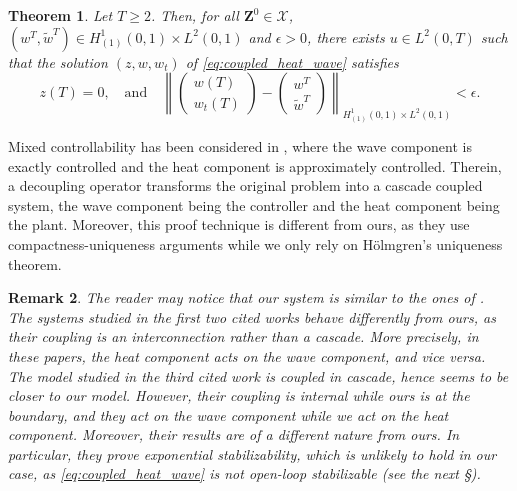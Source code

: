 \documentclass[10pt]{article}
\newtheorem{Theorem}{Theorem}[section]
\newtheorem{Remark}[Theorem]{Remark}
\begin{document}
\begin{Theorem}\label{theo:mixed_quakes}
Let $T \geq 2$. Then, for all $\mathbf{Z}^0 \in \mathcal{X}$, $(w^T,\tilde w^T) \in H^1_{(1)}(0,1) \times L^2(0,1)$ and $\epsilon > 0$, there exists $u \in L^2(0,T)$ such that the solution $(z,w,w_t)$ of \eqref{eq:coupled_heat_wave} satisfies
\begin{equation}\label{eq:contro_simul}
z(T) = 0,\quad \mathrm{and} \quad \left\| \left( \begin{array}{c}
    w(T)  \\
    w_t(T) 
\end{array}\right) - \left( \begin{array}{c}
    w^T  \\
    \tilde{w}^T
\end{array}\right) \right\|_{H^1_{(1)}(0,1) \times L^2(0,1)} < \epsilon.
\end{equation}
\end{Theorem}
Mixed controllability has been considered in \cite{zuazua_control_thermoelastic}, where the wave component is exactly controlled and the heat component is approximately controlled. Therein, a decoupling operator transforms the original problem into a cascade coupled system, the wave component being the controller and the heat component being the plant. Moreover, this proof technique is different from ours, as they use compactness-uniqueness arguments while we only rely on Hölmgren's uniqueness theorem. 
\begin{Remark}
The reader may notice that our system is similar to the ones of \cite{Zhang_Zuazua, batty_paunonen,LhachemiPrieurTrelat2025}. The systems studied in the first two cited works behave differently from ours, as their coupling is an interconnection rather than a cascade. More precisely, in these papers, the heat component acts on the wave component, and vice versa. The model studied in the third cited work \cite{LhachemiPrieurTrelat2025} is coupled in cascade, hence seems to be closer to our model. However, their coupling is internal while ours is at the boundary, and they act on the wave component while we act on the heat component. Moreover, their results are of a different nature from ours. In particular, 
they prove exponential stabilizability, which is unlikely to hold in our case, as \eqref{eq:coupled_heat_wave} is not open-loop stabilizable (see the next \S). 
\end{Remark}
\end{document}
